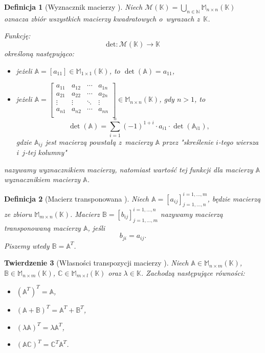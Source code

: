 \documentclass[12pt,a4paper]{report}
\newtheorem{df}{Definicja}[chapter]
\newtheorem{tw}[df]{Twierdzenie}
\newcommand{\setK}{\mathbb{K}}
\newcommand{\setN}{\mathbb{N}}
\newcommand{\wyznacznik}[1]{\operatorname{det}\left({#1} \right)}
\begin{document}
\begin{df}[Wyznacznik macierzy {\citep[Sec 10.1, Def. 10.1]{alzega}}]
Niech $\mathcal{M}(\setK)=\bigcup_{n\in \setN} \mathbb{M}_{n \times n}(\setK)$ oznacza zbiór wszystkich macierzy kwadratowych o~wyrazach z~$\setK$.

Funkcję:
$$
\mathrm{det} : \mathcal{M}(\setK) \to \setK
$$ 
określoną następująco:
\begin{itemize}
\item jeżeli $\mathbb{A}=[a_{11}]\in \mathbb{M}_{1 \times 1}(\setK)$, to $\wyznacznik{\mathbb{A}}=a_{11}$,
\item jeżeli $\mathbb{A} = \left[
        \begin{array}{cccc}
         a_{11} & a_{12} & \cdots & a_{1n} \\
         a_{21} & a_{22} & \cdots & a_{2n} \\
         \vdots & \vdots & \ddots & \vdots \\
         a_{n1} & a_{n2} & \cdots & a_{nn} \\
         \end{array}
      \right] \in \mathbb{M}_{n \times n}(\setK)$, gdy $n>1$, to
$$
\wyznacznik{\mathbb{A}} = \sum_{i=1}^n (-1)^{1+i} \cdot a_{i1} \cdot \wyznacznik{\mathbb{A}_{i1}},
$$
gdzie 
$\mathbb{A}_{ij}$ jest macierzą powstałą z~macierzy $\mathbb{A}$ przez "skreślenie $i$-tego wiersza i~$j$-tej kolumny"
\end{itemize}
nazywamy wyznacznikiem macierzy, natomiast wartość tej funkcji dla macierzy $\mathbb{A}$ wyznacznikiem macierzy $\mathbb{A}$.
\end{df}


\begin{df}[Macierz transponowana {\citep[Sec 8.1 ]{alzega}}]
Niech $\mathbb{A} = [a_{ij}]_{j = 1, \ldots, n}^{i = 1, \ldots , m}$, będzie macierzą ze zbioru $\mathbb{M}_{m \times n}(\setK)$.
Macierz $\mathbb{B} = [b_{ij}]_{j = 1, \ldots, m}^{i = 1, \ldots , n}$ nazywamy macierzą transponowaną macierzy $\mathbb{A}$, jeśli 
$$
b_{ji} = a_{ij}.
$$ 
Piszemy wtedy $\mathbb{B} = \mathbb{A}^T$.
\end{df}

\begin{tw}[Własności transpozycji macierzy {\citep[Sec 5.1 Tw. 5.1]{ealIII}}]
Niech $\mathbb{A} \in \mathbb{M}_{n \times m} (\setK)$, $\mathbb{B} \in \mathbb{M}_{n \times m} (\setK)$, $\mathbb{C} \in \mathbb{M}_{m \times l} (\setK)$ oraz $\lambda \in \setK$.
Zachodzą następujące równości:
\begin{itemize}
\item $(\mathbb{A}^T)^T = \mathbb{A}$,
\item $(\mathbb{A} + \mathbb{B})^T = \mathbb{A}^T + \mathbb{B}^T$,
\item $(\lambda \mathbb{A})^T = \lambda \mathbb{A}^T$,
\item $(\mathbb{A}\mathbb{C})^T = \mathbb{C}^T \mathbb{A}^T$.
\end{itemize}
\end{tw}
\end{document}

